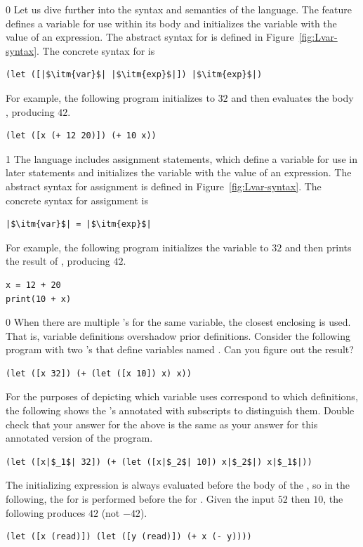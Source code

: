 \documentclass[7x10]{TimesAPriori_MIT}%
\def\racketEd{0}
\def\pythonEd{1}
\def\edition{1}
\begin{document}
{\if\edition\racketEd
Let us dive further into the syntax and semantics of the \LangVar{}
language.  The  feature defines a variable for use within its
body and initializes the variable with the value of an expression.
The abstract syntax for  is defined in
Figure~\ref{fig:Lvar-syntax}.  The concrete syntax for  is
\begin{lstlisting}
(let ([|$\itm{var}$| |$\itm{exp}$|]) |$\itm{exp}$|)
\end{lstlisting}
For example, the following program initializes  to $32$ and then
evaluates the body , producing $42$.
\begin{lstlisting}
(let ([x (+ 12 20)]) (+ 10 x))
\end{lstlisting}
\fi}
%
{\if\edition\pythonEd
%
The \LangVar{} language includes assignment statements, which define a
variable for use in later statements and initializes the variable with
the value of an expression.  The abstract syntax for assignment is
defined in Figure~\ref{fig:Lvar-syntax}.  The concrete syntax for
assignment is
\begin{lstlisting}
|$\itm{var}$| = |$\itm{exp}$|
\end{lstlisting}
For example, the following program initializes the variable 
to $32$ and then prints the result of , producing $42$.
\begin{lstlisting}
x = 12 + 20
print(10 + x)
\end{lstlisting}
\fi}

{\if\edition\racketEd
%  
When there are multiple 's for the same variable, the closest
enclosing  is used. That is, variable definitions overshadow
prior definitions. Consider the following program with two 's
that define variables named . Can you figure out the result?
\begin{lstlisting}
(let ([x 32]) (+ (let ([x 10]) x) x))
\end{lstlisting}
For the purposes of depicting which variable uses correspond to which
definitions, the following shows the 's annotated with
subscripts to distinguish them. Double check that your answer for the
above is the same as your answer for this annotated version of the
program.
\begin{lstlisting}
(let ([x|$_1$| 32]) (+ (let ([x|$_2$| 10]) x|$_2$|) x|$_1$|))
\end{lstlisting}
The initializing expression is always evaluated before the body of the
, so in the following, the  for  is
performed before the  for . Given the input
$52$ then $10$, the following produces $42$ (not $-42$).
\begin{lstlisting}
(let ([x (read)]) (let ([y (read)]) (+ x (- y))))
\end{lstlisting}
\fi}
\end{document}
